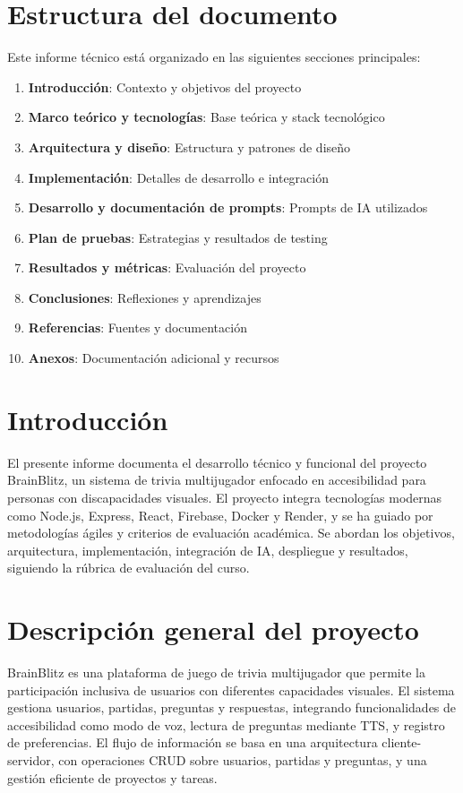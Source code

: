 \documentclass[12pt]{article}
\begin{document}
\tableofcontents
\newpage

\section*{Estructura del documento}
Este informe técnico está organizado en las siguientes secciones principales:

\begin{enumerate}
    \item \textbf{Introducción}: Contexto y objetivos del proyecto
    \item \textbf{Marco teórico y tecnologías}: Base teórica y stack tecnológico
    \item \textbf{Arquitectura y diseño}: Estructura y patrones de diseño
    \item \textbf{Implementación}: Detalles de desarrollo e integración
    \item \textbf{Desarrollo y documentación de prompts}: Prompts de IA utilizados
    \item \textbf{Plan de pruebas}: Estrategias y resultados de testing
    \item \textbf{Resultados y métricas}: Evaluación del proyecto
    \item \textbf{Conclusiones}: Reflexiones y aprendizajes
    \item \textbf{Referencias}: Fuentes y documentación
    \item \textbf{Anexos}: Documentación adicional y recursos
\end{enumerate}

\newpage

\section{Introducción}
El presente informe documenta el desarrollo técnico y funcional del proyecto BrainBlitz, un sistema de trivia multijugador enfocado en accesibilidad para personas con discapacidades visuales. El proyecto integra tecnologías modernas como Node.js, Express, React, Firebase, Docker y Render, y se ha guiado por metodologías ágiles y criterios de evaluación académica. Se abordan los objetivos, arquitectura, implementación, integración de IA, despliegue y resultados, siguiendo la rúbrica de evaluación del curso.

\section{Descripción general del proyecto}
BrainBlitz es una plataforma de juego de trivia multijugador que permite la participación inclusiva de usuarios con diferentes capacidades visuales. El sistema gestiona usuarios, partidas, preguntas y respuestas, integrando funcionalidades de accesibilidad como modo de voz, lectura de preguntas mediante TTS, y registro de preferencias. El flujo de información se basa en una arquitectura cliente-servidor, con operaciones CRUD sobre usuarios, partidas y preguntas, y una gestión eficiente de proyectos y tareas.
\end{document}
